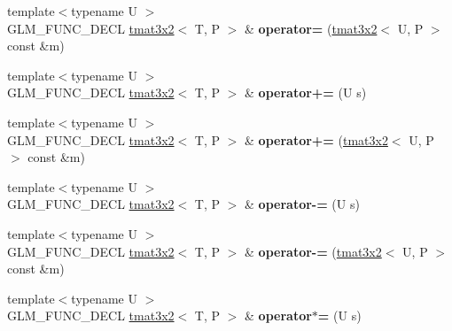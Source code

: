 \begin{DoxyCompactItemize}
\item 
\hypertarget{structglm_1_1tmat3x2_a5d7234f313530abc1c77413d15fa6882}{{\footnotesize template$<$typename U $>$ }\\G\-L\-M\-\_\-\-F\-U\-N\-C\-\_\-\-D\-E\-C\-L \hyperlink{structglm_1_1tmat3x2}{tmat3x2}$<$ T, P $>$ \& {\bfseries operator=} (\hyperlink{structglm_1_1tmat3x2}{tmat3x2}$<$ U, P $>$ const \&m)}\label{structglm_1_1tmat3x2_a5d7234f313530abc1c77413d15fa6882}

\item 
\hypertarget{structglm_1_1tmat3x2_a20c86d9ea265c20b6605d28b2d84fd3a}{{\footnotesize template$<$typename U $>$ }\\G\-L\-M\-\_\-\-F\-U\-N\-C\-\_\-\-D\-E\-C\-L \hyperlink{structglm_1_1tmat3x2}{tmat3x2}$<$ T, P $>$ \& {\bfseries operator+=} (U s)}\label{structglm_1_1tmat3x2_a20c86d9ea265c20b6605d28b2d84fd3a}

\item 
\hypertarget{structglm_1_1tmat3x2_a75faae5987f07b3f08a1843c3b6a71f0}{{\footnotesize template$<$typename U $>$ }\\G\-L\-M\-\_\-\-F\-U\-N\-C\-\_\-\-D\-E\-C\-L \hyperlink{structglm_1_1tmat3x2}{tmat3x2}$<$ T, P $>$ \& {\bfseries operator+=} (\hyperlink{structglm_1_1tmat3x2}{tmat3x2}$<$ U, P $>$ const \&m)}\label{structglm_1_1tmat3x2_a75faae5987f07b3f08a1843c3b6a71f0}

\item 
\hypertarget{structglm_1_1tmat3x2_a5ecf048090305a4539010afcb534654b}{{\footnotesize template$<$typename U $>$ }\\G\-L\-M\-\_\-\-F\-U\-N\-C\-\_\-\-D\-E\-C\-L \hyperlink{structglm_1_1tmat3x2}{tmat3x2}$<$ T, P $>$ \& {\bfseries operator-\/=} (U s)}\label{structglm_1_1tmat3x2_a5ecf048090305a4539010afcb534654b}

\item 
\hypertarget{structglm_1_1tmat3x2_a83a6c7b5f90654989b78deda2e1ccf20}{{\footnotesize template$<$typename U $>$ }\\G\-L\-M\-\_\-\-F\-U\-N\-C\-\_\-\-D\-E\-C\-L \hyperlink{structglm_1_1tmat3x2}{tmat3x2}$<$ T, P $>$ \& {\bfseries operator-\/=} (\hyperlink{structglm_1_1tmat3x2}{tmat3x2}$<$ U, P $>$ const \&m)}\label{structglm_1_1tmat3x2_a83a6c7b5f90654989b78deda2e1ccf20}

\item 
\hypertarget{structglm_1_1tmat3x2_a00ce13519a2e6415da2fb8d363fc065b}{{\footnotesize template$<$typename U $>$ }\\G\-L\-M\-\_\-\-F\-U\-N\-C\-\_\-\-D\-E\-C\-L \hyperlink{structglm_1_1tmat3x2}{tmat3x2}$<$ T, P $>$ \& {\bfseries operator$\ast$=} (U s)}\label{structglm_1_1tmat3x2_a00ce13519a2e6415da2fb8d363fc065b}


\end{DoxyCompactItemize}
